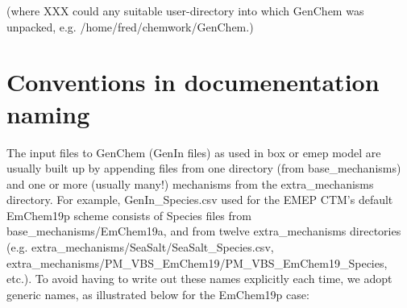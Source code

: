 \documentclass[a4paper,10pt,english]{sphinxmanual}
\begin{document}
\begin{sphinxVerbatim}[commandchars=\\\{\}]
                 
         
 
 
           

                 
             
         

              
       
  
 
\end{sphinxVerbatim}

(where XXX could any suitable user-directory into which GenChem was unpacked, e.g. /home/fred/chemwork/GenChem.)


\section{Conventions in documenentation naming}
\label{\detokenize{GenChemDoc_intro:conventions-in-documenentation-naming}}
The input files to GenChem (GenIn files) as used in box or emep model
are usually built up by appending files from one  directory (from
base\_mechanisms) and one or more (usually many!)  mechanisms
from the extra\_mechanisms directory. For example, GenIn\_Species.csv
used for  the EMEP CTM’s default EmChem19p scheme consists of  Species
files from base\_mechanisms/EmChem19a, and from twelve extra\_mechanisms
directories (e.g. extra\_mechanisms/SeaSalt/SeaSalt\_Species.csv,
extra\_mechanisms/PM\_VBS\_EmChem19/PM\_VBS\_EmChem19\_Species, etc.). To
avoid having to write out these names explicitly each time, we adopt
generic names, as illustrated below for the EmChem19p case:
\end{document}
